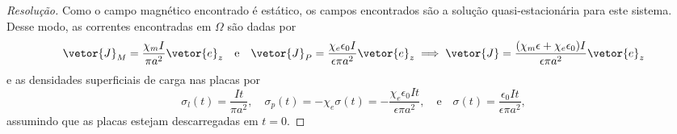 \begin{proof}[Resolução]
    Como o campo magnético encontrado é estático, os campos encontrados são a solução quasi-estacionária para este sistema. Desse modo, as correntes encontradas em \(\Omega\) são dadas por
    \begin{equation*}
        \vetor{J}_M = \frac{\chi_m I}{\pi a^2}\vetor{e}_z\quad\text{e}\quad
        \vetor{J}_P = \frac{\chi_e \epsilon_0 I}{\epsilon\pi a^2}\vetor{e}_z \implies \vetor{J} = \frac{(\chi_m \epsilon + \chi_e \epsilon_0)I}{\epsilon \pi a^2}\vetor{e}_z%
    \end{equation*}
    e as densidades superficiais de carga nas placas por
    \begin{equation*}
        \sigma_l(t) = \frac{It}{\pi a^2},\quad
        \sigma_p(t) = - \chi_e \sigma(t) = -\frac{\chi_e \epsilon_0It}{\epsilon\pi a^2},\quad\text{e}\quad
        \sigma(t) = \frac{\epsilon_0It}{\epsilon\pi a^2},
    \end{equation*}
    assumindo que as placas estejam descarregadas em \(t = 0\).


\end{proof}
